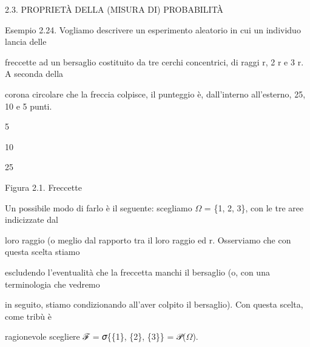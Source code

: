 \documentclass[a4paper,portrait,12pt]{article}
\begin{document}
\begin{flushleft}
2.3. PROPRIET\`{A} DELLA (MISURA DI) PROBABILIT\`{A}
\end{flushleft}


\begin{flushleft}
Esempio 2.24. Vogliamo descrivere un esperimento aleatorio in cui un individuo lancia delle
\end{flushleft}


\begin{flushleft}
freccette ad un bersaglio costituito da tre cerchi concentrici, di raggi r, 2 r e 3 r. A seconda della
\end{flushleft}


\begin{flushleft}
corona circolare che la freccia colpisce, il punteggio \`{e}, dall'interno all'esterno, 25, 10 e 5 punti.
\end{flushleft}


5


10





25





\begin{flushleft}
Figura 2.1. Freccette
\end{flushleft}





\begin{flushleft}
Un possibile modo di farlo \`{e} il seguente: scegliamo $\Omega$ = \{1, 2, 3\}, con le tre aree indicizzate dal
\end{flushleft}


\begin{flushleft}
loro raggio (o meglio dal rapporto tra il loro raggio ed r. Osserviamo che con questa scelta stiamo
\end{flushleft}


\begin{flushleft}
escludendo l'eventualit\`{a} che la freccetta manchi il bersaglio (o, con una terminologia che vedremo
\end{flushleft}


\begin{flushleft}
in seguito, stiamo condizionando all'aver colpito il bersaglio). Con questa scelta, come tribù \`{e}
\end{flushleft}


\begin{flushleft}
ragionevole scegliere ℱ = 𝜎\{\{1\}, \{2\}, \{3\}\} = 𝒫($\Omega$).
\end{flushleft}
\end{document}

